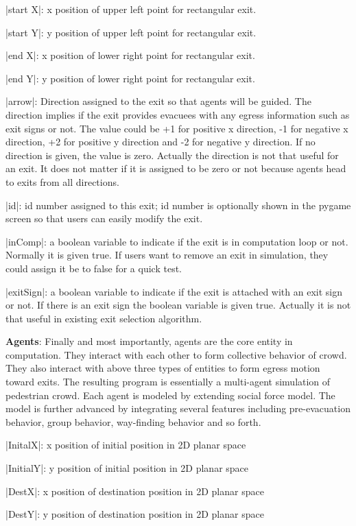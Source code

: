 \documentclass[english]{article}
\begin{document}
|start X|: x position of upper left point for rectangular exit.

|start Y|: y position of upper left point for rectangular exit.

|end X|: x position of lower right point for rectangular exit.

|end Y|: y position of lower right point for rectangular exit.

|arrow|: Direction assigned to the exit so that agents will be guided.
The direction implies if the exit provides evacuees with any egress
information such as exit signs or not. The value could be +1 for positive
x direction, -1 for negative x direction, +2 for positive y direction
and -2 for negative y direction. If no direction is given, the value
is zero. Actually the direction is not that useful for an exit. It
does not matter if it is assigned to be zero or not because agents
head to exits from all directions.

|id|: id number assigned to this exit; id number is optionally shown
in the pygame screen so that users can easily modify the exit.

|inComp|: a boolean variable to indicate if the exit is in computation
loop or not. Normally it is given true. If users want to remove an
exit in simulation, they could assign it be to false for a quick test.

|exitSign|: a boolean variable to indicate if the exit is attached
with an exit sign or not. If there is an exit sign the boolean variable
is given true. Actually it is not that useful in existing exit selection
algorithm. 

\textbf{Agents}: Finally and most importantly, agents are the core
entity in computation. They interact with each other to form collective
behavior of crowd. They also interact with above three types of entities
to form egress motion toward exits. The resulting program is essentially
a multi-agent simulation of pedestrian crowd. Each agent is modeled
by extending social force model. The model is further advanced by
integrating several features including pre-evacuation behavior\cite{Proulx1993},
group behavior, way-finding behavior and so forth.

|InitalX|: x position of initial position in 2D planar space

|InitialY|: y position of initial position in 2D planar space

|DestX|: x position of destination position in 2D planar space

|DestY|: y position of destination position in 2D planar space
\end{document}
